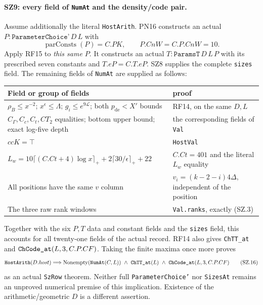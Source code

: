 \documentclass[11pt,a4paper]{article}
\numberwithin{equation}{section}
\theoremstyle{remark}\newtheorem{remark}[theorem]{Remark}
\begin{document}
\paragraph{SZ9: every field of \texttt{NumAt} and the density/code pair.}
Assume additionally the literal \texttt{HostArith}. PN16 constructs
an actual $P:\texttt{ParameterChoice'}\,D\,L$ with
\[
          \operatorname{parConsts}(P)=C.PK,
                       \qquad P.CnW=C.P.CnW=10.
\]
Apply RF15 to \emph{this same $P$}. It constructs an actual
$T:\texttt{ParamsT}\,D\,L\,P$ with its prescribed seven constants
and $T.eP=C.T.eP$. SZ8 supplies the complete \texttt{sizes} field.
The remaining fields of \texttt{NumAt} are supplied as follows:
\begin{center}\small
\begin{tabular}{p{}p{}}
Field or group of fields & proof\\\hline
$\rho_B\leq x^{-2}$; $x^\epsilon\leq\Lambda$;
$g_i\leq e^{9\mathcal L}$; both $p_{\mathrm{de}}<X'$ bounds
 & RF14, on the same $D,L$\\
$C_\Gamma,C_c,C_t,CT_2$ equalities; bottom upper bound;
exact log-five depth & the corresponding fields of \texttt{Val}\\
$ccK=\top$ & \texttt{HostVal}\\
$L_w=10\lceil(C.Ct+4)\log x\rceil_+
                 +2\lceil30/\epsilon\rceil_++22$
 & $C.Ct=401$ and the literal $L_w$ equality\\
All positions have the same $v$ column
 & $v_i=(k-2-i)4\Delta$, independent of the position\\
The three raw rank windows & \texttt{Val.ranks}, exactly (SZ.3)
\end{tabular}
\end{center}
Together with the six $P,T$ data and constant fields and the
\texttt{sizes} field, this accounts for all twenty-one fields of
the actual record. RF14 also gives \texttt{ChTT\_\allowbreak at} and
$\texttt{ChCode\_\allowbreak at}(L,3,C.P.CF)$. Taking the finite maxima once
more proves
\[
 \texttt{HostArith}(D.host)\Longrightarrow
 \operatorname{Nonempty}(\texttt{NumAt}(C,L))
 \ \land\ \texttt{ChTT\_\allowbreak at}(L)
 \ \land\ \texttt{ChCode\_\allowbreak at}(L,3,C.P.CF)                    \tag{SZ.16}
\]
as an actual \texttt{SzRow} theorem. Neither full
\texttt{ParameterChoice'} nor \texttt{SizesAt} remains an
unproved numerical premise of this implication. Existence of the
arithmetic/geometric $D$ is a different assertion.
\end{document}
